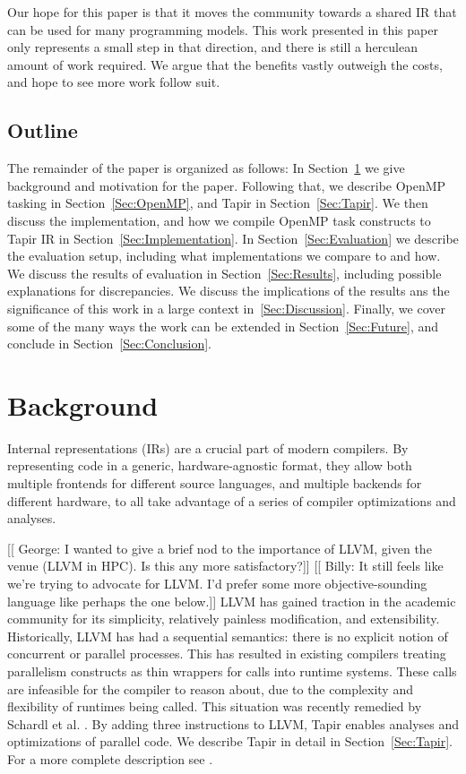 \documentclass[sigconf]{acmart}
\newcommand{\wmnote}[1]{{\scriptsize \color{red} [[ Billy: #1]]}}
\newcommand{\gsnote}[1]{{\scriptsize \color{blue} [[ George: #1]]}}
\begin{document}
Our hope for this paper is that it moves the community towards a shared IR that
can be used for many programming models. This work presented in this paper only
represents a small step in that direction, and there is still a herculean amount
of work required. We argue that the benefits vastly outweigh the costs, and
hope to see more work follow suit. 

\subsection{Outline}

The remainder of the paper is organized as follows: In Section~\ref{Sec:Background} 
we give background and motivation for the paper. Following that, we describe OpenMP
tasking in Section~\ref{Sec:OpenMP}, and Tapir in Section~\ref{Sec:Tapir}. We then 
discuss the implementation, and how we compile OpenMP task constructs to Tapir IR in
Section~\ref{Sec:Implementation}. In Section~\ref{Sec:Evaluation} we describe the 
evaluation setup, including what implementations we compare to and how. We discuss
the results of evaluation in Section~\ref{Sec:Results}, including possible
explanations for discrepancies. We discuss the implications of the results ans the
significance of this work in a large context in~\ref{Sec:Discussion}. Finally,
we cover some of the many ways the work can be extended in
Section~\ref{Sec:Future}, and conclude in Section~\ref{Sec:Conclusion}.

\section{Background} \label{Sec:Background}

Internal representations (IRs) are a crucial part of modern compilers.  By
representing code in a generic, hardware-agnostic format, they allow both
multiple frontends for different source languages, and multiple backends for
different hardware, to all take advantage of a series of compiler optimizations
and analyses. 

\gsnote{I wanted to give a brief nod to the importance of LLVM, given the venue
(LLVM in HPC). Is this any more satisfactory?}
\wmnote{It still feels like we're trying to advocate for LLVM. I'd prefer some
more objective-sounding language like perhaps the one below.}
LLVM has gained traction in the academic community for its simplicity,
relatively painless modification, and extensibility\cite{lattner2004llvm}.
Historically, LLVM has had a sequential semantics: there is no explicit notion
of concurrent or parallel processes. This has resulted in existing compilers
treating parallelism constructs as thin wrappers for calls into runtime
systems. These calls are infeasible for the compiler to reason about, due to
the complexity and flexibility of runtimes being called. This situation was
recently remedied by Schardl et al. \cite{tapir}. By adding three instructions
to LLVM, Tapir enables analyses and optimizations of parallel code. We describe
Tapir in detail in Section~\ref{Sec:Tapir}. For a more complete description see
\cite{tapir}. 
\end{document}
